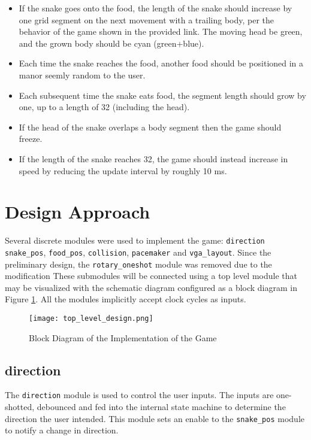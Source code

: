 \documentclass[paper=usletter, fontsize=12pt]{article}
\begin{document}
\begin{itemize}
        \item If the snake goes onto the food, the length of the snake should
        increase by one grid segment on the next movement with a trailing body,
        per the behavior of the game shown in the provided link. The moving
        head be green, and the grown body should be cyan (green+blue).

        \item Each time the snake reaches the food, another food should be
        positioned in a manor seemly random to the user.

        \item Each subsequent time the snake eats food, the segment length
        should grow by one, up to a length of 32 (including the head).

        \item If the head of the snake overlaps a body segment then the game
        should freeze.

        \item If the length of the snake reaches 32, the game should instead
        increase in speed by reducing the update interval by roughly 10 ms.

    \end{itemize}

    \section{Design Approach} Several discrete modules were used to implement
    the game: \texttt{direction} \texttt{snake\_pos}, \texttt{food\_pos},
    \texttt{collision}, \texttt{pacemaker} and \texttt{vga\_layout}. Since the
    preliminary design, the \texttt{rotary\_oneshot} module was removed due to
    the modification  These submodules will be connected using a top level
    module that may be visualized with the schematic diagram configured as a
    block diagram in Figure \ref{fig:schematic}. All the modules implicitly
    accept clock cycles as inputs.

    \begin{figure}[ht]
        \begin{center}
            \texttt{[image: top\_level\_design.png]}
            \caption{Block Diagram of the Implementation of the Game}
            \label{fig:schematic}
        \end{center}
    \end{figure}
    \newpage

        \subsection{direction} The \texttt{direction} module is used to control
        the user inputs. The inputs are one-shotted, debounced and fed into the
        internal state machine to determine the direction the user intended.
        This module sets an enable to the \texttt{snake\_pos} module to notify
        a change in direction.
\end{document}
